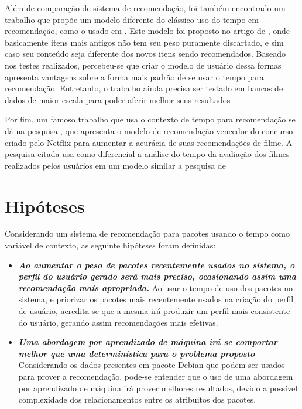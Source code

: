 Além de comparação de sistema de recomendação, foi também encontrado um trabalho que propõe um modelo diferente do clássico uso do tempo em recomendação, como o usado em
\cite{ding2005time}. Este modelo foi proposto no artigo de \cite{basile2015modeling}, onde basicamente itens mais antigos não tem seu peso puramente discartado, e sim caso
seu conteúdo seja diferente dos novos itens sendo recomendados. Baseado nos testes realizados, percebeu-se que criar o modelo de usuário dessa formas apresenta vantagens sobre
a forma mais padrão de se usar o tempo para recomendação. Entretanto, o trabalho ainda precisa ser testado em bancos de dados de maior escala para poder aferir melhor seus
resultados

Por fim, um famoso trabalho que usa o contexto de tempo para recomendação se dá na pesquisa \cite{koren2010collaborative}, que apresenta o modelo de recomendação vencedor
do concurso criado pelo Netflix para aumentar a acurácia de suas recomendações de filme. A pesquisa citada usa como diferencial a análise do tempo da avaliação dos filmes
realizados pelos usuários em um modelo similar a pesquisa de \cite{basile2015modeling}


\section{Hipóteses}

Considerando um sistema de recomendação para pacotes usando o tempo como variável de contexto, as seguinte hipóteses foram definidas:

\begin{itemize} \item \textit{\textbf{Ao aumentar o peso de pacotes
recentemente usados no sistema, o perfil do usuário gerado será mais preciso,
ocasionando assim uma recomendação mais apropriada.}} Ao usar o tempo de uso dos
pacotes no sistema, e priorizar os pacotes mais recentemente usados na criação
do perfil de usuário, acredita-se que a mesma irá produzir um perfil mais
consistente do usuário, gerando assim recomendações mais efetivas.\item
\textit{\textbf{Uma abordagem por aprendizado de máquina irá se comportar melhor
        que uma determinística para o problema proposto}}
Considerando os dados presentes em pacote Debian que podem ser
usados para prover a recomendação, pode-se entender que o uso de uma abordagem
por aprendizado de máquina irá prover melhores resultados, devido a possível
complexidade dos relacionamentos entre os atribuitos dos pacotes.
\end{itemize}

